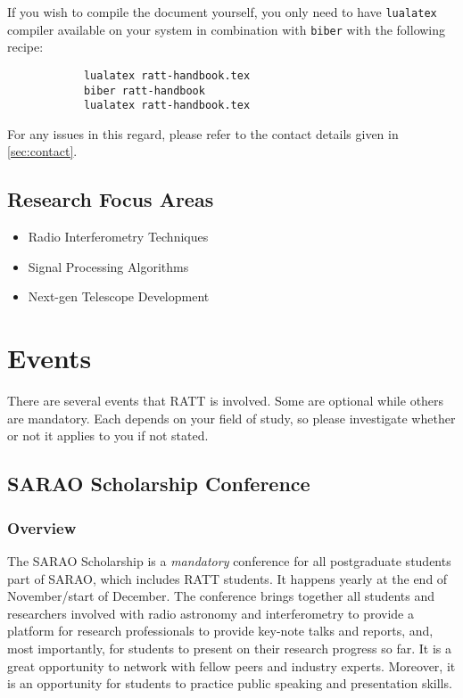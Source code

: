 \documentclass[12pt]{article}
\begin{document}
        If you wish to compile the document yourself, you only need to have \texttt{lualatex} compiler available on your system in combination with \texttt{biber} with the following recipe:

        \begin{verbatim}
            lualatex ratt-handbook.tex
            biber ratt-handbook
            lualatex ratt-handbook.tex
        \end{verbatim}

        For any issues in this regard, please refer to the contact details given in \cref{sec:contact}.

    \subsection{Research Focus Areas}
        \begin{itemize}
            \item Radio Interferometry Techniques
            \item Signal Processing Algorithms
            \item Next-gen Telescope Development
        \end{itemize}

\newpage

\section{Events}\label{sec:2:events}
    There are several events that RATT is involved. Some are optional while others are mandatory. Each depends on your field of study, so please investigate whether or not it applies to you if not stated.

    \subsection{SARAO Scholarship Conference}\label{subsec:sarao_scholarship_conference}

    \subsubsection{Overview}\label{subsubsec:overview}
        The SARAO Scholarship is a \emph{mandatory} conference for all postgraduate students part of SARAO, which includes RATT students. It happens yearly at the end of November/start of December. The conference brings together all students and researchers involved with radio astronomy and interferometry to provide a platform for research professionals to provide key-note talks and reports, and, most importantly, for students to present on their research progress so far. It is a great opportunity to network with fellow peers and industry experts. Moreover, it is an opportunity for students to practice public speaking and presentation skills.
\end{document}
